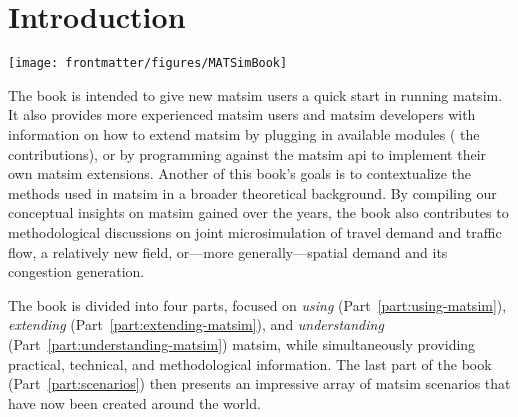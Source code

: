 \chapter*{Introduction}

\begin{center} \texttt{[image: frontmatter/figures/MATSimBook]} \end{center}

%
%
The book is intended to give new \gls{matsim} users a quick start in running \gls{matsim}. It also provides more experienced \gls{matsim} users and \gls{matsim} developers with 
information on how to extend \gls{matsim} by plugging in available modules (\eg 
the \glspl{contribution}),  or by programming against the \gls{matsim} \gls{api} to implement their own \gls{matsim} \glspl{extension}. Another of this book's 
goals is to contextualize the methods used in \gls{matsim} in a broader theoretical background. By compiling our conceptual insights on \gls{matsim} gained over the years, the book also contributes to methodological discussions on joint \gls{microsimulation} of travel demand and traffic flow, a relatively new field, or---more generally---spatial demand and its congestion generation.

The book is divided into four parts, focused on \emph{using} (Part~\ref{part:using-matsim}), \emph{extending} (Part~\ref{part:extending-matsim}), and \emph{understanding} (Part~\ref{part:understanding-matsim}) \gls{matsim}, 
while simultaneously providing practical, technical, and methodological information. The last part of the book (Part~\ref{part:scenarios}) then presents an impressive array of  \gls{matsim} scenarios that have now been created around the world. %

